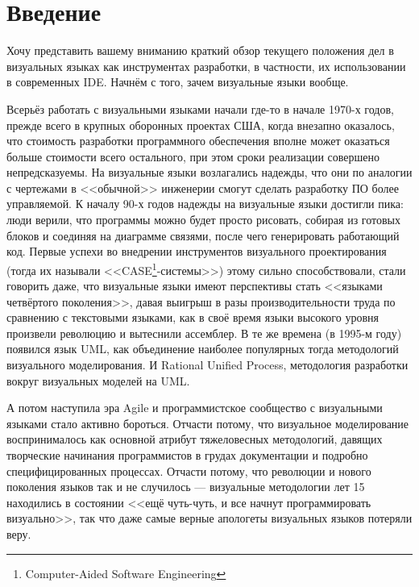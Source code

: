 \documentclass{text-style}
\begin{document}
\maketitle
\thispagestyle{empty}

\section{Введение}

Хочу представить вашему вниманию краткий обзор текущего положения дел в визуальных языках как инструментах разработки, в частности, их использовании в современных IDE. Начнём с того, зачем визуальные языки вообще.

Всерьёз работать с визуальными языками начали где-то в начале 1970-х годов, прежде всего в крупных оборонных проектах США, когда внезапно оказалось, что стоимость разработки программного обеспечения вполне может оказаться больше стоимости всего остального, при этом сроки реализации совершено непредсказуемы. На визуальные языки возлагались надежды, что они по аналогии с чертежами в <<обычной>> инженерии смогут сделать разработку ПО более управляемой. К началу 90-х годов надежды на визуальные языки достигли пика: люди верили, что программы можно будет просто рисовать, собирая из готовых блоков и соединяя на диаграмме связями, после чего генерировать работающий код. Первые успехи во внедрении инструментов визуального проектирования (тогда их называли <<CASE\footnote{Computer-Aided Software Engineering}-системы>>) этому сильно способствовали, стали говорить даже, что визуальные языки имеют перспективы стать <<языками четвёртого поколения>>, давая выигрыш в разы производительности труда по сравнению с текстовыми языками, как в своё время языки высокого уровня произвели революцию и вытеснили ассемблер. В те же времена (в 1995-м году) появился язык UML, как объединение наиболее популярных тогда методологий визуального моделирования. И Rational Unified Process, методология разработки вокруг визуальных моделей на UML. 

А потом наступила эра Agile и программистское сообщество с визуальными языками стало активно бороться. Отчасти потому, что визуальное моделирование воспринималось как основной атрибут тяжеловесных методологий, давящих творческие начинания программистов в грудах документации и подробно специфицированных процессах. Отчасти потому, что революции и нового поколения языков так и не случилось --- визуальные методологии лет 15 находились в состоянии <<ещё чуть-чуть, и все начнут программировать визуально>>, так что даже самые верные апологеты визуальных языков потеряли веру. 
\end{document}
